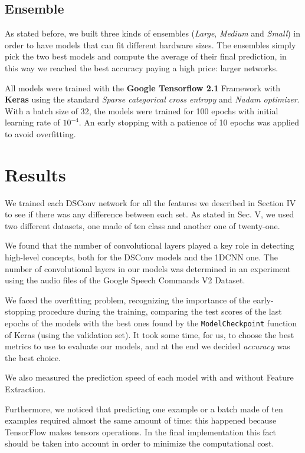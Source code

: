 \documentclass[conference]{IEEEtran}
\begin{document}
\subsection{Ensemble}
\vspace{-1mm}
As stated before, we built three kinds of ensembles (\textit{Large}, \textit{Medium} and \textit{Small}) in order to have models that can fit different hardware sizes.  The ensembles simply pick the two best models and compute the average of their final prediction, in this way we reached the best accuracy paying a high price: larger networks.

All models were trained with the \textbf{Google Tensorflow 2.1} Framework with \textbf{Keras} using the standard \textit{Sparse categorical cross entropy} and \textit{Nadam optimizer}. With a batch size of 32, the models were trained for 100 epochs with initial learning rate of $10^{-4}$. An early stopping with a patience of 10 epochs was applied to avoid overfitting.

\section{Results}
We trained each DSConv network for all the features we described in Section IV to see if there was any difference between each set. As stated in Sec. V, we used two different datasets, one made of ten class and another one of twenty-one.

We found that the number of convolutional layers played a key role in detecting high-level concepts, both for the DSConv models and the 1DCNN one. The number of convolutional layers in our models was determined in an experiment using the audio files of the Google Speech Commands V2 Dataset.

We faced the overfitting problem, recognizing the importance of the early-stopping procedure during the training, comparing the test scores of the last epochs of the models with the best ones found by the \texttt{ModelCheckpoint} function of Keras (using the validation set).
It took some time, for us, to choose the best metrics to use to evaluate our models, and at the end we decided \textit{accuracy} was the best choice.

We also measured the prediction speed of each model with and without Feature Extraction. 

Furthermore, we noticed that predicting one example or a batch made of ten examples required almost the same amount of time: this happened because TensorFlow makes tensors operations. In the final implementation this fact should be taken into account in order to minimize the computational cost.
\end{document}
